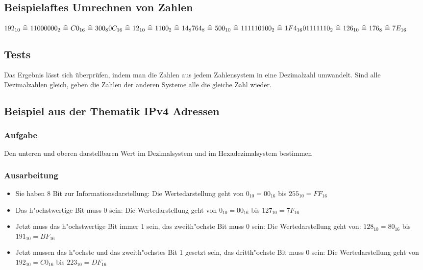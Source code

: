\documentclass[a4paper,11pt,titlepage]{article}
\begin{document}
\subsection{Beispielaftes Umrechnen von Zahlen}

$192_{10}\ \widehat{=}\ 11000000_2\ \widehat{=}\ C0_{16}\ \widehat{=}\ 300_{8}\\
\\
0C_{16}\ \widehat{=}\ 12_{10}\ \widehat{=}\ 1100_2\ \widehat{=}\ 14_8\\
\\
764_{8}\ \widehat{=}\ 500_{10}\ \widehat{=}\ 111110100_2\ \widehat{=}\ 1F4_{16}\\
\\
01111110_2\ \widehat{=}\ 126_{10}\ \widehat{=}\ 176_8\ \widehat{=}\ 7E_{16}$
\\

\subsection{Tests}
Das Ergebnis lässt sich überprüfen, indem man die Zahlen aus jedem Zahlensystem in eine Dezimalzahl umwandelt. Sind alle Dezimalzahlen gleich, geben die Zahlen der anderen Systeme alle die gleiche Zahl wieder.

\subsection{Beispiel aus der Thematik IPv4 Adressen}
\subsubsection{Aufgabe}
Den unteren und oberen darstellbaren Wert im Dezimalsystem und im Hexadezimalsystem bestimmen
\subsubsection{Ausarbeitung}
\begin{itemize} 
\item Sie haben 8 Bit zur Informationsdarstellung: Die Wertedarstellung geht von $0_{10} = 00_{16}$ 
bis $255_{10} = FF_{16}$
\item Das h"ochstwertige Bit muss 0 sein: Die Wertedarstellung geht von $0_{10} = 00_{16}$ 
bis $127_{10} = 7F_{16}$
\item Jetzt muss das h"ochstwertige Bit immer 1 sein, das zweith"ochste Bit muss 0 sein: 
Die Wertedarstellung geht von: $128_{10} = 80_{16}$ bis $191_{10} =BF_{16}$
\item  Jetzt mussen das h"ochste und das zweith"ochstes Bit 1 gesetzt sein, das dritth"ochste Bit muss 0 sein: 
Die Wertedarstellung geht von $192_{10} = C0_{16}$ bis $223_{10} =DF_{16}$
\end{itemize}
\end{document}
